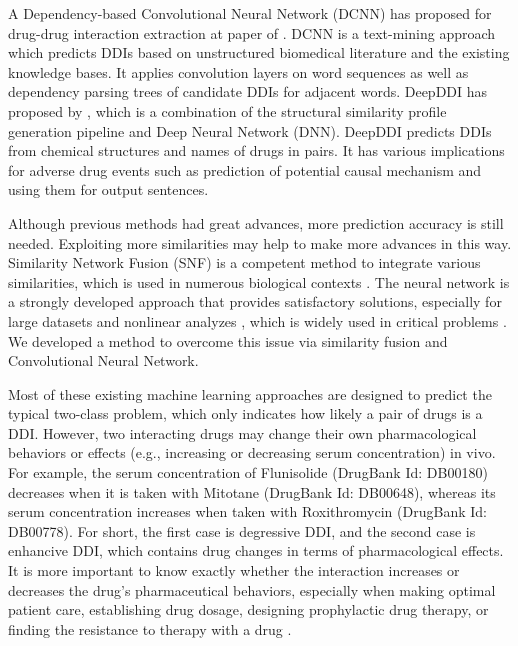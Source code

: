 \documentclass{bmcart}
\begin{document}
A Dependency-based Convolutional Neural Network (DCNN) has proposed for drug-drug interaction extraction at paper of \cite{liu2016dependency}.
DCNN is a text-mining approach which predicts DDIs based on unstructured biomedical literature and the existing knowledge bases. It applies convolution layers on word sequences as well as dependency parsing trees of candidate DDIs for adjacent words.
DeepDDI has proposed by \cite{ryu2018deep}, which is a combination of the structural similarity profile generation pipeline and Deep Neural Network (DNN). DeepDDI predicts DDIs from chemical structures and names of drugs in pairs. It has various implications for adverse drug events such as prediction of potential causal mechanism and using them for output sentences.

Although previous methods had great advances, more prediction accuracy is still needed.  Exploiting more similarities may help to make more advances in this way. Similarity Network Fusion (SNF) \cite{wang2014similarity} is a competent method to integrate various similarities, which is used in numerous biological contexts \cite{olayan2018ddr, tian2017constructing, kim2016understanding}. The neural network is a strongly developed approach that provides satisfactory solutions, especially for large datasets and nonlinear analyzes \cite{wang2016predicting}, which is widely used in critical problems \cite{huang2009effect, fu2017deep, pan2016ipminer}. We developed a method to overcome this issue via similarity fusion and Convolutional Neural Network.

Most of these existing machine learning approaches are designed to predict the typical two-class problem, which only indicates how likely a pair of drugs is a DDI. However, two interacting drugs may change their own pharmacological behaviors or effects (e.g., increasing or decreasing serum concentration) in vivo. For example, the serum concentration of Flunisolide (DrugBank Id: DB00180) decreases when it is taken with Mitotane (DrugBank Id: DB00648), whereas its serum concentration increases when taken with Roxithromycin (DrugBank Id: DB00778). For short, the first case is degressive DDI, and the second case is enhancive DDI, which contains drug changes in terms of pharmacological effects. It is more important to know exactly whether the interaction increases or decreases the drug's pharmaceutical behaviors, especially when making optimal patient care, establishing drug dosage, designing prophylactic drug therapy, or finding the resistance to therapy with a drug
\cite{koch1981serum}.
\end{document}
